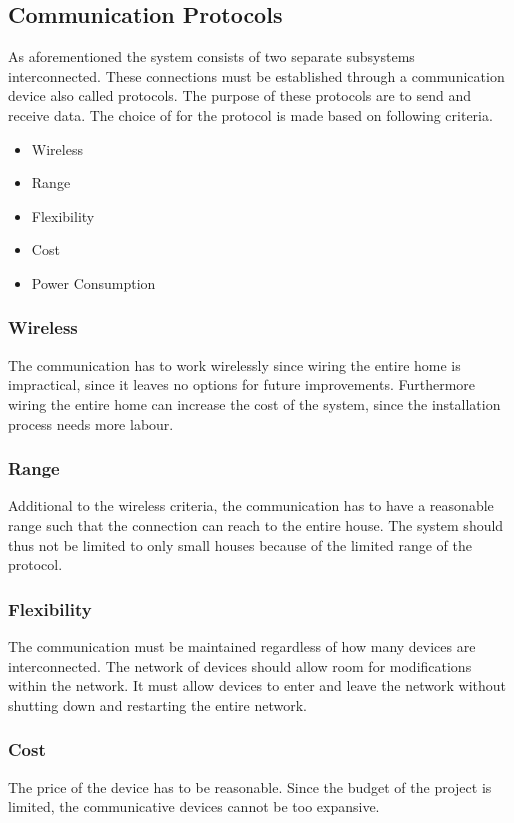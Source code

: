 \subsection{Communication Protocols}
\label{sub:Communicationprotocols}
As aforementioned the system consists of two separate subsystems interconnected. These connections must be established through a communication device also called protocols. The purpose of these protocols are to send and receive data. The choice of for the protocol is made based on following criteria.
\begin{itemize}
  \item Wireless
  \item Range
  \item Flexibility
  \item Cost
  \item Power Consumption
\end{itemize}

\subsubsection{Wireless}
The communication has to work wirelessly since wiring the entire home is impractical, since it leaves no options for future improvements. Furthermore wiring the entire home can increase the cost of the system, since the installation process needs more labour.

\subsubsection{Range}
Additional to the wireless criteria, the communication has to have a reasonable range such that the connection can reach to the entire house. The system should thus not be limited to only small houses because of the limited range of the protocol.

\subsubsection{Flexibility}
The communication must be maintained regardless of how many devices are interconnected. The network of devices should allow room for modifications within the network. It must allow devices to enter and leave the network without shutting down and restarting the entire network.

\subsubsection{Cost}
The price of the device has to be reasonable. Since the budget of the project is limited, the communicative devices cannot be too expansive.

